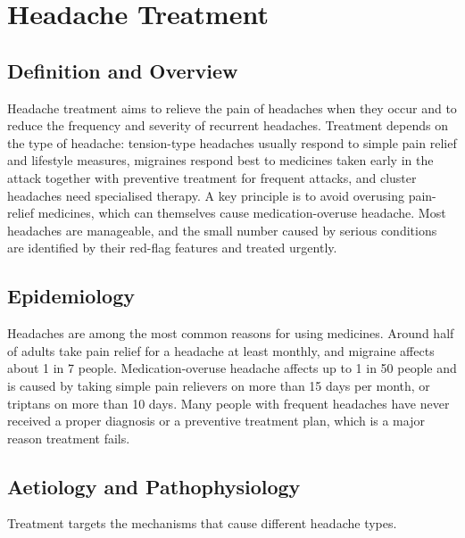 \chapter{Headache Treatment}

\section*{Definition and Overview}
Headache treatment aims to relieve the pain of headaches when they occur and to reduce the frequency and severity of recurrent headaches. Treatment depends on the type of headache: tension-type headaches usually respond to simple pain relief and lifestyle measures, migraines respond best to medicines taken early in the attack together with preventive treatment for frequent attacks, and cluster headaches need specialised therapy. A key principle is to avoid overusing pain-relief medicines, which can themselves cause medication-overuse headache. Most headaches are manageable, and the small number caused by serious conditions are identified by their red-flag features and treated urgently.

\section*{Epidemiology}
Headaches are among the most common reasons for using medicines. Around half of adults take pain relief for a headache at least monthly, and migraine affects about 1 in 7 people. Medication-overuse headache affects up to 1 in 50 people and is caused by taking simple pain relievers on more than 15 days per month, or triptans on more than 10 days. Many people with frequent headaches have never received a proper diagnosis or a preventive treatment plan, which is a major reason treatment fails.

\section*{Aetiology and Pathophysiology}
Treatment targets the mechanisms that cause different headache types.

